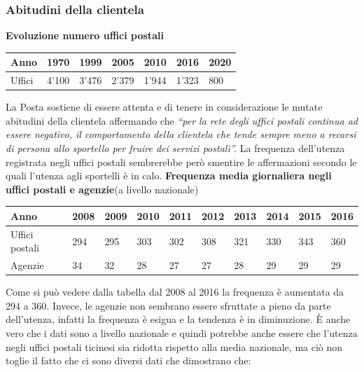 \subsubsection{Abitudini della clientela}
\textbf{Evoluzione numero uffici postali}
\begin{table}[h]
\begin{tabular}{|l|l|l|l|l|l|l|}
\hline
Anno   & 1970  & 1999  & 2005  & 2010  & 2016  & 2020 \\ \hline
Uffici & 4'100 & 3'476 & 2'379 & 1'944 & 1'323 & 800  \\ \hline
\end{tabular}
\end{table}
La Posta sostiene di essere attenta e di tenere in considerazione le mutate abitudini della clientela affermando che \textit{“per la rete degli uffici postali continua ad essere negativo, il comportamento della clientela che tende sempre meno a recarsi di persona allo sportello per fruire dei servizi postali”.}
La frequenza dell’utenza registrata negli uffici postali sembrerebbe però smentire le affermazioni secondo le quali l’utenza agli sportelli è in calo.
\newpage
\textbf{Frequenza media giornaliera negli uffici postali e agenzie}(a livello nazionale)
\begin{table}[h]
\begin{tabular}{|l|l|l|l|l|l|l|l|l|l|}
\hline
\textbf{Anno}  & \textbf{2008} & \textbf{2009} & \textbf{2010} & \textbf{2011} & \textbf{2012} & \textbf{2013} & \textbf{2014} & \textbf{2015} & \textbf{2016} \\ \hline
Uffici postali & 294           & 295           & 303           & 302           & 308           & 321           & 330           & 343           & 360           \\ \hline
Agenzie        & 34            & 32            & 28            & 27            & 27            & 28            & 29            & 29            & 29            \\ \hline
\end{tabular}
\end{table}
Come si può vedere dalla tabella dal 2008 al 2016 la frequenza è aumentata da 294 a 360. Invece, le agenzie non sembrano essere sfruttate a pieno da parte dell’utenza, infatti la frequenza è esigua e la tendenza è in diminuzione. È anche vero che i dati sono a livello nazionale e quindi potrebbe anche essere che l’utenza negli uffici postali ticinesi sia ridotta rispetto alla media nazionale, ma ciò non toglie il fatto che ci sono diversi dati che dimostrano che:
